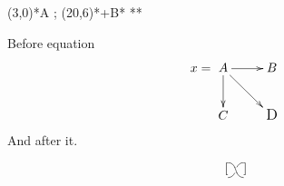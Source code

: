 \documentclass{article}
\begin{document}
\xy (3,0)*{A} ; (20,6)*+{B}*\cir{} **\dir{-} \endxy


Before equation
\[ x = \xymatrix{A \ar[r] \ar[d] \ar[rd] & B \\ C & \hbox{\large D}} \]
And after it.

\[ [\raise5pt\xybox{0;/r1pc/:\htwist}] \]
\end{document}
